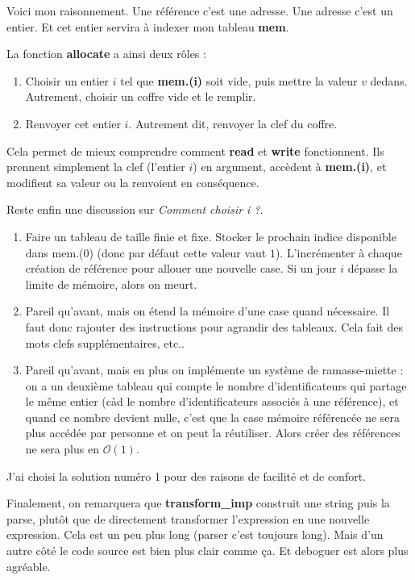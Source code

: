 \documentclass[a4paper,10pt]{report}
\begin{document}
Voici mon raisonnement. Une référence c'est une adresse. Une adresse c'est un entier. Et cet entier servira à indexer mon tableau \textbf{mem}.  
  
La fonction \textbf{allocate} a ainsi deux rôles :

\begin{enumerate}
\item Choisir un entier $i$ tel que \textbf{mem.(i)} soit vide, puis mettre la valeur $v$ dedans. Autrement, choisir un coffre vide et le remplir.  
\item Renvoyer cet entier $i$. Autrement dit, renvoyer la clef du coffre.  
\end{enumerate}

Cela permet de mieux comprendre comment \textbf{read} et \textbf{write} fonctionnent. Ils prennent simplement la clef (l'entier $i$) en argument, accèdent à \textbf{mem.(i)}, et modifient sa valeur ou la renvoient en conséquence.  
  
Reste enfin une discussion sur \textit{Comment choisir i ?}.  

\begin{enumerate}
\item Faire un tableau de taille finie et fixe. Stocker le prochain indice disponible dans mem.(0) (donc par défaut cette valeur vaut $1$). L'incrémenter à chaque création de référence pour allouer une nouvelle case. Si un jour $i$ dépasse la limite de mémoire, alors on meurt.
\item Pareil qu'avant, mais on étend la mémoire d'une case quand nécessaire. Il faut donc rajouter des instructions pour agrandir des tableaux. Cela fait des mots clefs supplémentaires, etc..
\item Pareil qu'avant, mais en plus on implémente un système de ramasse-miette : on a un deuxième tableau qui compte le nombre d'identificateurs qui partage le même entier (càd le nombre d'identificateurs associés à une référence), et quand ce nombre devient nulle, c'est que la case mémoire référencée ne sera plus accédée par personne et on peut la réutiliser. Alors créer des références ne sera plus en $\mathcal{O}(1)$.
\end{enumerate}
  
J'ai choisi la solution numéro 1 pour des raisons de facilité et de confort. 
  
Finalement, on remarquera que \textbf{transform\_{}imp} construit une string puis la parse, plutôt que de directement transformer l'expression en une nouvelle expression. Cela est un peu plus long (parser c'est toujours long). Mais d'un autre côté le code source est bien plus clair comme ça. Et deboguer est alors plus agréable.
\end{document}
